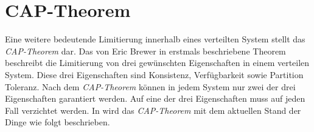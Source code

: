 \section{CAP-Theorem}\label{sec:distributedSystems:capTheorem}
Eine weitere bedeutende Limitierung innerhalb eines verteilten System stellt das \textit{CAP-Theorem}  dar. Das von Eric Brewer in \cite{Brewer2000TowardsSystems}  erstmals beschriebene Theorem beschreibt die Limitierung von drei gewünschten Eigenschaften in einem verteilen System. Diese drei Eigenschaften sind Konsistenz, Verfügbarkeit sowie Partition Toleranz. Nach dem \textit{CAP-Theorem} können in jedem System nur zwei der drei Eigenschaften garantiert werden. Auf eine der drei Eigenschaften muss auf jeden Fall verzichtet werden. In \cite{gilbertPerspectiveCAPTheorem2012} wird das \textit{CAP-Theorem} mit dem aktuellen Stand der Dinge wie folgt beschrieben.

